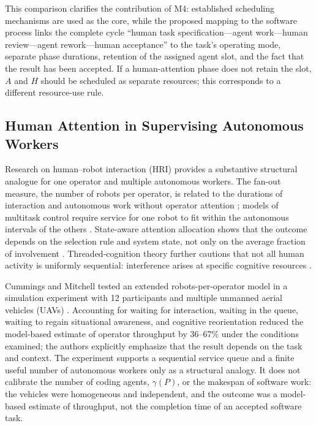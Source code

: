 This comparison clarifies the contribution of M4: established scheduling
mechanisms are used as the core, while the proposed mapping to the software
process links the complete cycle ``human task specification---agent
work---human review---agent rework---human acceptance'' to the task's operating
mode, separate phase durations, retention of the assigned agent slot, and the
fact that the result has been accepted. If a human-attention phase does not
retain the slot, $A$ and $H$ should be scheduled as separate resources; this
corresponds to a different resource-use rule.

\subsection{Human Attention in Supervising Autonomous Workers}

Research on human--robot interaction (HRI) provides a substantive structural
analogue for one operator and multiple autonomous workers. The fan-out measure,
the number of robots per operator, is related to the durations of interaction
and autonomous work without operator attention \cite{olsen2004fanout}; models
of multitask control require service for one robot to fit within the autonomous
intervals of the others \cite{crandall2005validating}. State-aware attention
allocation shows that the outcome depends on the selection rule and system
state, not only on the average fraction of involvement
\cite{crandall2011computing}. Threaded-cognition theory further cautions that
not all human activity is uniformly sequential: interference arises at
specific cognitive resources \cite{salvucci2008threaded}.

Cummings and Mitchell tested an extended robots-per-operator model in a
simulation experiment with 12 participants and multiple unmanned aerial
vehicles (UAVs) \cite{cummings2008predicting}. Accounting for waiting for
interaction, waiting in the queue, waiting to regain situational awareness, and
cognitive reorientation reduced the model-based estimate of operator throughput
by 36--67\% under the conditions examined; the authors explicitly emphasize
that the result depends on the task and context. The experiment supports a
sequential service queue and a finite useful number of autonomous workers only
as a structural analogy. It does not calibrate the number of coding agents,
$\gamma(P)$, or the makespan of software work: the vehicles were homogeneous
and independent, and the outcome was a model-based estimate of throughput, not
the completion time of an accepted software task.
